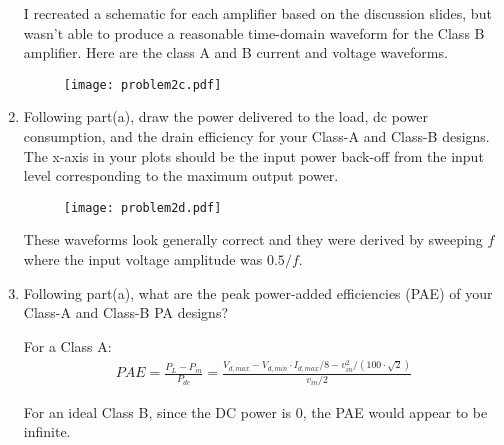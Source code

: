 \begin{enumerate}[label=(\alph*)]
    I recreated a schematic for each amplifier based on the discussion slides, but wasn't able to produce a reasonable time-domain waveform for the Class B amplifier.
    Here are the class A and B current and voltage waveforms.

    \begin{figure}[H]
        \centering \texttt{[image: problem2c.pdf]}
    \end{figure}

    \item {\color{blue} Following part(a), draw the power delivered to the load, dc power consumption, and the drain efficiency for your Class-A and Class-B designs. The x-axis in your plots should be the input power back-off from the input level corresponding to the maximum output power.}

    \begin{figure}[H]
        \centering \texttt{[image: problem2d.pdf]}
    \end{figure}

    These waveforms look generally correct and they were derived by sweeping $f$ where the input voltage amplitude was $0.5 / f$.

    \item {\color{blue} Following part(a), what are the peak power-added efficiencies (PAE) of your Class-A and Class-B PA designs?}

    For a Class A:
    \begin{align*}
        PAE = \frac{P_L - P_{in}}{P_{dc}} = \frac{V_{d,max} - V_{d,min} \cdot I_{d,max}/8 - v_{in}^2 / (100 \cdot \sqrt{2})}{v_{in}/2}
    \end{align*}

    For an ideal Class B, since the DC power is 0, the PAE would appear to be infinite.
\end{enumerate}


